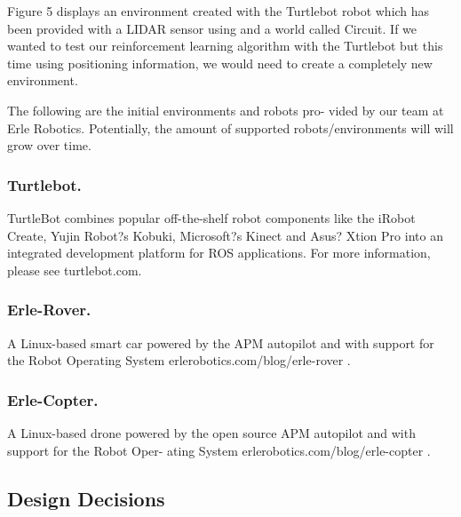 Figure 5 displays an environment created with the Turtlebot robot which has been provided with a LIDAR sensor using and a world called Circuit. If we wanted to test our reinforcement learning algorithm with the Turtlebot but this time using positioning information, we would need to create a completely new environment.

The following are the initial environments and robots pro- vided by our team at Erle Robotics. Potentially, the amount of supported robots/environments will will grow over time.

\subsubsection{Turtlebot.} TurtleBot combines popular off-the-shelf robot components like the iRobot Create, Yujin Robot?s Kobuki, Microsoft?s Kinect and Asus? Xtion Pro into an integrated development platform for ROS applications. For more information, please see turtlebot.com.

\subsubsection{Erle-Rover.} A Linux-based smart car powered by the APM autopilot and with support for the Robot Operating System erlerobotics.com/blog/erle-rover .

\subsubsection{Erle-Copter.} A Linux-based drone powered by the open source APM autopilot and with support for the Robot Oper- ating System erlerobotics.com/blog/erle-copter .

\subsection{Design Decisions}

